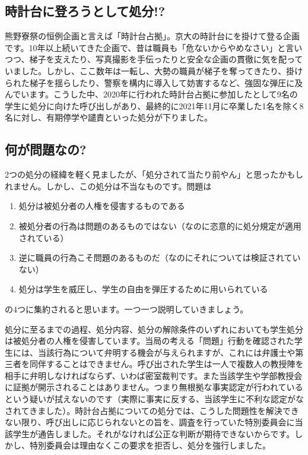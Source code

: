 \subsection{時計台に登ろうとして処分!?}
熊野寮祭の恒例企画と言えば「時計台占拠」。京大の時計台にを掛けて登る企画です。10年以上続いてきた企画で、昔は職員も「危ないからやめなさい」と言いつつ、梯子を支えたり、写真撮影を手伝ったりと安全な企画の貫徹に気を配っていました。しかし、ここ数年は一転し、大勢の職員が梯子を奪ってきたり、掛けられた梯子を揺らしたり、警察を構内に導入して妨害するなど、強固な弾圧に及んでいます。こうした中、2020年に行われた時計台占拠に参加したとして9名の学生に処分に向けた呼び出しがあり、最終的に2021年11月に卒業した1名を除く8名に対し、有期停学や譴責といった処分が下りました。


\subsection{何が問題なの?}
2つの処分の経緯を軽く見ましたが、「処分されて当たり前やん」と思ったかもしれません。しかし、この処分は不当なものです。問題は
\begin{enumerate}
    \item 処分は被処分者の人権を侵害するものである
    \item 被処分者の行為は問題のあるものではない（なのに恣意的に処分規定が適用されている）
    \item 逆に職員の行為こそ問題のあるものだ（なのにそれについては検証されていない）
    \item 処分は学生を威圧し、学生の自由を弾圧するために用いられている
\end{enumerate}
の4つに集約されると思います。一つ一つ説明していきましょう。

\vspace{4mm}
\noindent{}

処分に至るまでの過程、処分内容、処分の解除条件のいずれにおいても学生処分は被処分者の人権を侵害しています。当局の考える「問題」行動を確認された学生には、当該行為について弁明する機会が与えられますが、これには弁護士や第三者を同伴することはできません。呼び出された学生は一人で複数人の教授陣を相手に弁明しなければならず、いわば密室裁判です。また当該学生や学部教授会に証拠が開示されることはありません。つまり無根拠な事実認定が行われているという疑いが拭えないのです（実際に事実に反する、当該学生に不利な認定がなされてきました）。時計台占拠についての処分では、こうした問題性を解決できない限り、呼び出しに応じられないとの旨を、調査を行っていた特別委員会に当該学生が通告しました。それがなければ公正な判断が期待できないからです。しかし、特別委員会は理由なくこの要求を拒否し、処分を強行しました。

